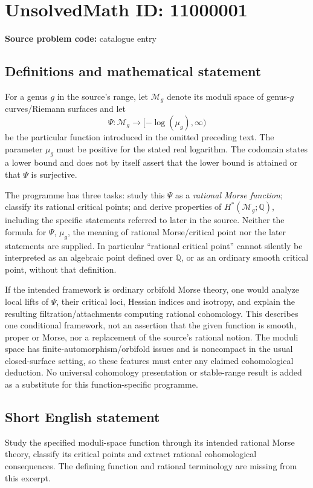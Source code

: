 \documentclass[11pt]{article}
\newcommand{\Q}{\mathbb{Q}}
\begin{document}
\section*{UnsolvedMath ID: 11000001}
\textbf{Source problem code:} catalogue entry
\subsection{Definitions and mathematical statement}
For a genus \(g\) in the source's range, let \(\mathcal M_g\) denote its moduli space of genus-\(g\) curves/Riemann surfaces and let
\[\Psi:\mathcal M_g\longrightarrow[-\log(\mu_g),\infty)\]
be the particular function introduced in the omitted preceding text. The parameter \(\mu_g\) must be positive for the stated real logarithm. The codomain states a lower bound and does not by itself assert that the lower bound is attained or that \(\Psi\) is surjective.

The programme has three tasks: study this \(\Psi\) as a \emph{rational Morse function}; classify its rational critical points; and derive properties of \(H^*(\mathcal M_g;\Q)\), including the specific statements referred to later in the source. Neither the formula for \(\Psi\), \(\mu_g\), the meaning of rational Morse/critical point nor the later statements are supplied. In particular ``rational critical point'' cannot silently be interpreted as an algebraic point defined over \(\Q\), or as an ordinary smooth critical point, without that definition.

If the intended framework is ordinary orbifold Morse theory, one would analyze local lifts of \(\Psi\), their critical loci, Hessian indices and isotropy, and explain the resulting filtration/attachments computing rational cohomology. This describes one conditional framework, not an assertion that the given function is smooth, proper or Morse, nor a replacement of the source's rational notion. The moduli space has finite-automorphism/orbifold issues and is noncompact in the usual closed-surface setting, so these features must enter any claimed cohomological deduction. No universal cohomology presentation or stable-range result is added as a substitute for this function-specific programme.
\subsection{Short English statement}
Study the specified moduli-space function through its intended rational Morse theory, classify its critical points and extract rational cohomological consequences. The defining function and rational terminology are missing from this excerpt.
\end{document}
